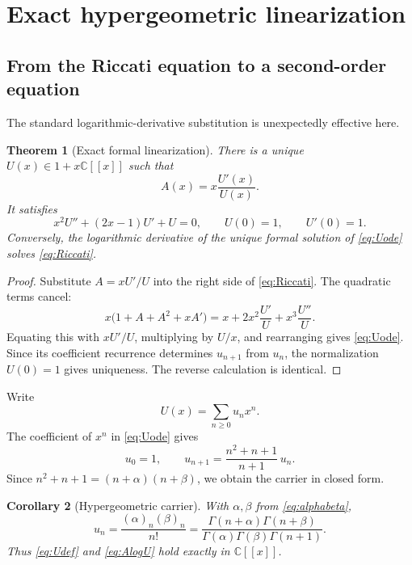 \documentclass[11pt,a4paper]{article}
\newtheorem{theorem}{Theorem}[section]
\newtheorem{corollary}[theorem]{Corollary}
\theoremstyle{definition}
\theoremstyle{remark}
\newcommand{\C}{\mathbb{C}}
\begin{document}
\section{Exact hypergeometric linearization}

\subsection{From the Riccati equation to a second-order equation}

The standard logarithmic-derivative substitution is unexpectedly effective here.

\begin{theorem}[Exact formal linearization]\label{thm:linearization}
There is a unique \(U(x)\in1+x\C[[x]]\) such that
\begin{equation}\label{eq:substitution}
 A(x)=x\frac{U'(x)}{U(x)}.
\end{equation}
It satisfies
\begin{equation}\label{eq:Uode}
 x^2U''+(2x-1)U'+U=0,
 \qquad U(0)=1,\qquad U'(0)=1.
\end{equation}
Conversely, the logarithmic derivative of the unique formal solution of \eqref{eq:Uode} solves \eqref{eq:Riccati}.
\end{theorem}

\begin{proof}
Substitute \(A=xU'/U\) into the right side of \eqref{eq:Riccati}.  The quadratic terms cancel:
\[
 x\bigl(1+A+A^2+xA'\bigr)
 =x+2x^2\frac{U'}{U}+x^3\frac{U''}{U}.
\]
Equating this with \(xU'/U\), multiplying by \(U/x\), and rearranging gives \eqref{eq:Uode}.  Since its coefficient recurrence determines \(u_{n+1}\) from \(u_n\), the normalization \(U(0)=1\) gives uniqueness.  The reverse calculation is identical.
\end{proof}

Write
\[
 U(x)=\sum_{n\ge0}u_nx^n.
\]
The coefficient of \(x^n\) in \eqref{eq:Uode} gives
\begin{equation}\label{eq:urecurrence}
 u_0=1,
 \qquad
 u_{n+1}=\frac{n^2+n+1}{n+1}\,u_n.
\end{equation}
Since \(n^2+n+1=(n+\alpha)(n+\beta)\), we obtain the carrier in closed form.

\begin{corollary}[Hypergeometric carrier]\label{cor:carrier}
With \(\alpha,\beta\) from \eqref{eq:alphabeta},
\begin{equation}\label{eq:un}
 u_n=\frac{(\alpha)_n(\beta)_n}{n!}
 =\frac{\Gamma(n+\alpha)\Gamma(n+\beta)}
        {\Gamma(\alpha)\Gamma(\beta)\Gamma(n+1)}.
\end{equation}
Thus \eqref{eq:Udef} and \eqref{eq:AlogU} hold exactly in \(\C[[x]]\).
\end{corollary}
\end{document}
